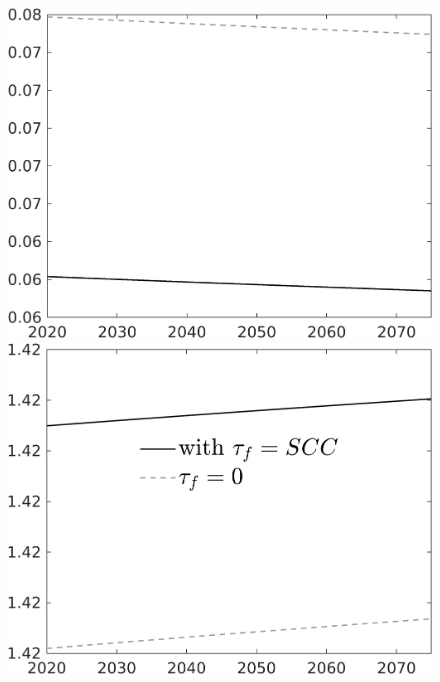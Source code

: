 \begin{figure}[h!!]
\begin{minipage}[]{0.32\textwidth}
\end{minipage}
\begin{minipage}[]{0.32\textwidth}
\includegraphics[width=1\textwidth]{../../codding_model/own_basedOnFried/optimalPol_010922_revision/figures/all_13Sept22/PerdifNoTauf_regime0_CompTaul_hhhl_spillover0_nsk0_xgr0_knspil0_sep0_LFlimit0_emsbase0_countec0_GovRev0_etaa0.79_lgd0.png}
\end{minipage}
\begin{minipage}[]{0.32\textwidth}
	\includegraphics[width=1\textwidth]{../../codding_model/own_basedOnFried/optimalPol_010922_revision/figures/all_13Sept22/LevTaufNoTauf_TaulCalib_regime0_hhhl_spillover0_nsk0_xgr0_knspil0_sep0_LFlimit0_emsbase0_countec0_GovRev0_etaa0.79_lgd1.png}

\end{minipage}
\end{figure}
